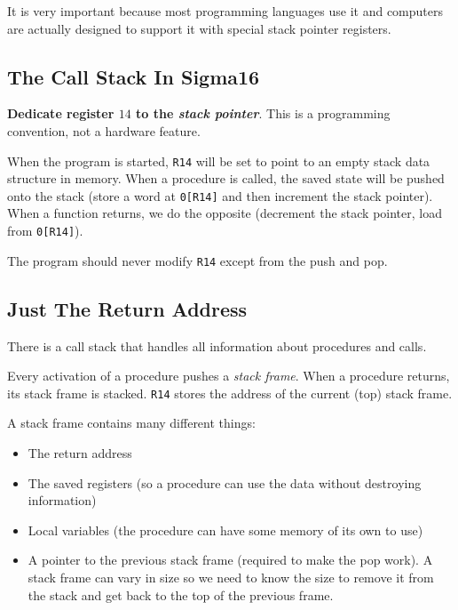 It is very important because most programming languages use it and computers are actually designed to support it with special stack pointer registers.

\subsection{The Call Stack In Sigma16}\label{sub:the_call_stack_in_sigma16}

\textbf{Dedicate register \(14\) to the \emph{stack pointer}}.
This is a programming convention, not a hardware feature.

When the program is started, \texttt{R14} will be set to point to an empty stack data structure in memory.
When a procedure is called, the saved state will be pushed onto the stack (store a word at \texttt{0[R14]} and then increment the stack pointer).
When a function returns, we do the opposite (decrement the stack pointer, load from \texttt{0[R14]}).

The program should never modify \texttt{R14} except from the push and pop.

\subsection{Just The Return Address}\label{sub:just_the_return_address}

There is a call stack that handles all information about procedures and calls.

Every activation of a procedure pushes a \emph{stack frame}.
When a procedure returns, its stack frame is stacked.
\texttt{R14} stores the address of the current (top) stack frame.

A stack frame contains many different things:
\begin{itemize}
	\item The return address
	\item The saved registers (so a procedure can use the data without destroying information)
	\item Local variables (the procedure can have some memory of its own to use)
	\item A pointer to the previous stack frame (required to make the pop work).
	      A stack frame can vary in size so we need to know the size to remove it from the stack and get back to the top of the previous frame.
\end{itemize}
